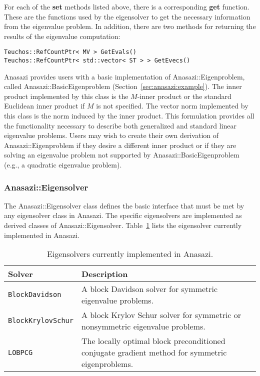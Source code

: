 For each of the \textbf{set} methods listed above, there is a corresponding
\textbf{get} function. These are the functions used by the eigensolver to get
the necessary information from the eigenvalue problem. In addition, there are
two methods for returning the results of the eigenvalue computation:
\begin{verbatim}
Teuchos::RefCountPtr< MV > GetEvals()
Teuchos::RefCountPtr< std::vector< ST > > GetEvecs()
\end{verbatim}

Anasazi provides users with a basic implementation of
Anasazi::Eigenproblem, called Anasazi::BasicEigenproblem
(Section~\ref{sec:anasazi:example}). The inner product implemented by this
class is the $M$-inner product or the standard Euclidean inner product if $M$
is not specified. The vector norm implemented by this class is the norm induced
by the inner product. This formulation provides all the functionality
necessary to describe both generalized and standard linear eigenvalue problems.
Users may wish to create their own derivation of Anasazi::Eigenproblem
if they desire a different inner product or if they are solving an eigenvalue
problem not supported by Anasazi::BasicEigenproblem (e.g., a quadratic
eigenvalue problem).

\subsubsection{Anasazi::Eigensolver}
\label{sec:anasazi:eigensolver}

The Anasazi::Eigensolver class defines the basic interface that must be
met by any eigensolver class in Anasazi. The specific eigensolvers are
implemented as derived classes of Anasazi::Eigensolver.
Table~\ref{tab:anasazi:solvers} lists the eigensolver currently implemented in
Anasazi.

\begin{table}[htp]
\begin{center}
\begin{tabular}{| p{4cm} p{10cm} |}
\hline
Solver & Description \\
\hline
{\tt BlockDavidson}    & A block Davidson solver for symmetric
                         eigenvalue problems.\\
{\tt BlockKrylovSchur} & A block Krylov Schur solver for symmetric or
                         nonsymmetric eigenvalue problems.\\
{\tt LOBPCG} & The locally optimal block preconditioned conjugate gradient
method for symmetric eigenproblems.\\
\hline
\end{tabular}
\caption{Eigensolvers currently implemented in Anasazi.}
\label{tab:anasazi:solvers}
\end{center}
\end{table}

